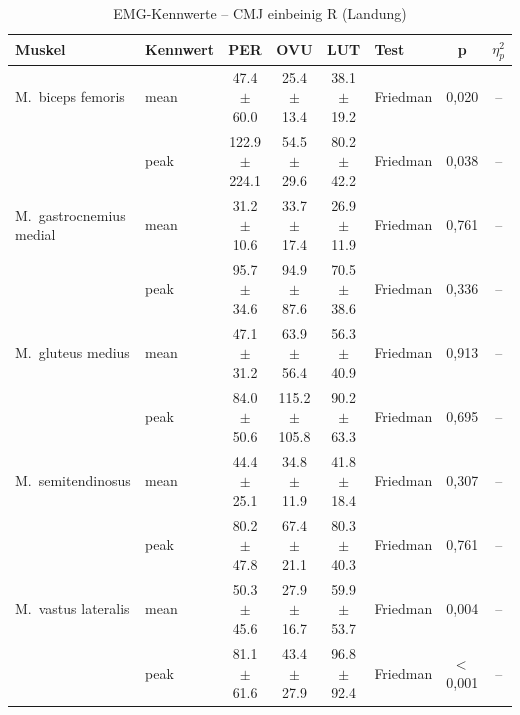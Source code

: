 \begin{table}[H]
  \centering
  \caption{EMG-Kennwerte – CMJ einbeinig R (Landung)}
  \label{tab:CMJ_einbeinig_R_Landung}
  \small
  \begin{tabular}{l l c c c l c c}
    \hline
    \textbf{Muskel} & \textbf{Kennwert} & \textbf{PER} & \textbf{OVU} & \textbf{LUT} & \textbf{Test} & \textbf{p} & \textbf{$\eta^2_p$} \\
    \hline
    M.~biceps femoris & mean & 47.4 $\pm$ 60.0 & 25.4 $\pm$ 13.4 & 38.1 $\pm$ 19.2 & Friedman & 0{,}020 & -- \\
     & peak & 122.9 $\pm$ 224.1 & 54.5 $\pm$ 29.6 & 80.2 $\pm$ 42.2 & Friedman & 0{,}038 & -- \\
    \hline
    M.~gastrocnemius medial & mean & 31.2 $\pm$ 10.6 & 33.7 $\pm$ 17.4 & 26.9 $\pm$ 11.9 & Friedman & 0{,}761 & -- \\
     & peak & 95.7 $\pm$ 34.6 & 94.9 $\pm$ 87.6 & 70.5 $\pm$ 38.6 & Friedman & 0{,}336 & -- \\
    \hline
    M.~gluteus medius & mean & 47.1 $\pm$ 31.2 & 63.9 $\pm$ 56.4 & 56.3 $\pm$ 40.9 & Friedman & 0{,}913 & -- \\
     & peak & 84.0 $\pm$ 50.6 & 115.2 $\pm$ 105.8 & 90.2 $\pm$ 63.3 & Friedman & 0{,}695 & -- \\
    \hline
    M.~semitendinosus & mean & 44.4 $\pm$ 25.1 & 34.8 $\pm$ 11.9 & 41.8 $\pm$ 18.4 & Friedman & 0{,}307 & -- \\
     & peak & 80.2 $\pm$ 47.8 & 67.4 $\pm$ 21.1 & 80.3 $\pm$ 40.3 & Friedman & 0{,}761 & -- \\
    \hline
    M.~vastus lateralis & mean & 50.3 $\pm$ 45.6 & 27.9 $\pm$ 16.7 & 59.9 $\pm$ 53.7 & Friedman & 0{,}004 & -- \\
     & peak & 81.1 $\pm$ 61.6 & 43.4 $\pm$ 27.9 & 96.8 $\pm$ 92.4 & Friedman & $<$\,0{,}001 & -- \\
    \hline
  \end{tabular}
\end{table}

